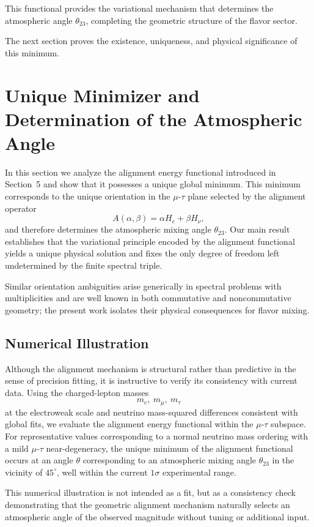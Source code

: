 This functional provides the variational mechanism that determines the atmospheric angle $\theta_{23}$, completing the geometric structure of the flavor sector.

The next section proves the existence, uniqueness, and physical significance of this minimum.


\section{Unique Minimizer and Determination of the Atmospheric Angle}

In this section we analyze the alignment energy functional introduced in Section~5 and show that it possesses a unique global minimum. This minimum corresponds to the unique orientation in the $\mu$-$\tau$ plane selected by the alignment operator
\[
A(\alpha,\beta)=\alpha H_e + \beta H_\nu,
\]
and therefore determines the atmospheric mixing angle $\theta_{23}$. Our main result establishes that the variational principle encoded by the alignment functional yields a unique physical solution and fixes the only degree of freedom left undetermined by the finite spectral triple.

Similar orientation ambiguities arise generically in spectral problems with multiplicities and are well known in both commutative and noncommutative geometry; the present work isolates their physical consequences for flavor mixing.

\subsection{Numerical Illustration}

Although the alignment mechanism is structural rather than predictive in the sense of precision fitting, it is instructive to verify its consistency with current data. Using the charged-lepton masses
\[
m_e,\ m_\mu,\ m_\tau
\]
at the electroweak scale and neutrino mass-squared differences consistent with global fits, we evaluate the alignment energy functional within the $\mu$-$\tau$ subspace. For representative values corresponding to a normal neutrino mass ordering with a mild $\mu$-$\tau$ near-degeneracy, the unique minimum of the alignment functional occurs at an angle $\theta$ corresponding to an atmospheric mixing angle $\theta_{23}$ in the vicinity of $45^\circ$, well within the current $1\sigma$ experimental range.

This numerical illustration is not intended as a fit, but as a consistency check demonstrating that the geometric alignment mechanism naturally selects an atmospheric angle of the observed magnitude without tuning or additional input.

